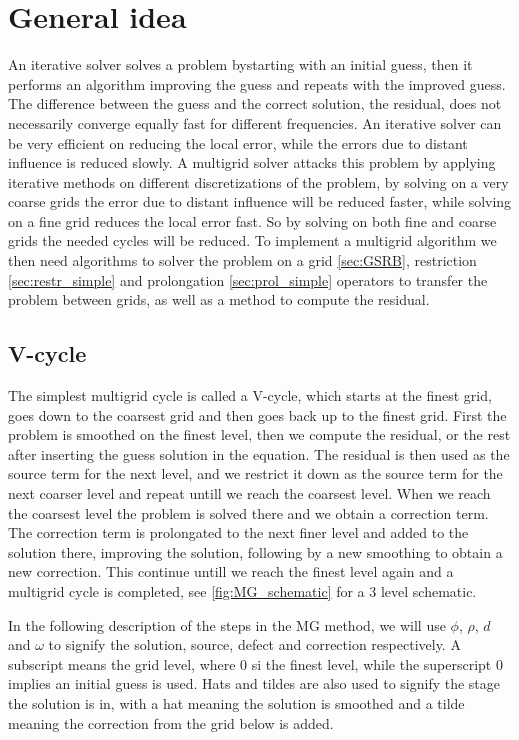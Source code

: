 
\section{General idea}
	\label{sec:mg_impl}
	An iterative solver solves a problem bystarting with an initial guess, then it performs an algorithm
	improving the guess and repeats with the improved guess. The difference between
	the guess and the correct solution, the residual, does not necessarily converge equally fast for different frequencies.
	An iterative solver can be very efficient on reducing the local error,
	while the errors due to distant influence is reduced slowly.
	A multigrid solver attacks this problem by applying iterative methods on different discretizations of the problem, by solving on a very coarse grids
	the error due to distant influence will be reduced faster, while solving on a fine grid reduces the local error fast. So by solving on both
	fine and coarse grids the needed cycles will be reduced. To implement a multigrid algorithm we then need algorithms to solver the problem on a grid \cref{sec:GSRB},
	restriction	\cref{sec:restr_simple} and prolongation \cref{sec:prol_simple} operators to transfer the problem between grids, as well as a method to compute the residual.


	\subsection{V-cycle}
		The simplest multigrid cycle is called a V-cycle, which starts at the finest grid, goes down to the coarsest grid and then goes back up
		to the finest grid.	First the problem is smoothed on the finest level, then we compute the residual, or the rest after inserting the guess solution
		in the equation. The residual is then used as the source term for the next level, and we restrict it down as the source term for the next
		coarser level and repeat untill we reach the coarsest level. When we reach the coarsest level the problem is solved there and we obtain a correction
		term. The correction term is prolongated to the next finer level and added to the solution there, improving the solution, following by a new smoothing
		to obtain a new correction. This continue untill we reach the finest level again and a multigrid cycle is completed, see \cref{fig:MG_schematic} for a 3
		level schematic.

		In the following description of the steps in the MG method, we will use \(\phi\), \(\rho\), \(d\) and \(\omega\) to signify the solution, source,
		defect and correction respectively. A subscript means the grid level, where \(0\) si the finest level, while the superscript \(0\) implies an initial guess is used. Hats and tildes are also
	 	used to signify the stage the solution is in, with a hat meaning the solution is smoothed and a tilde meaning the correction from the grid below is added.

